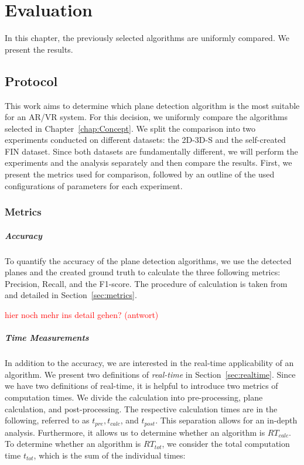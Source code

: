 \documentclass[main.tex]{subfiles}
\begin{document}
\chapter{Evaluation}
In this chapter, the previously selected algorithms are uniformly compared. We present the results.
\section{Protocol}

This work aims to determine which plane detection algorithm is the most suitable for an AR/VR system. For this decision, we uniformly compare the algorithms selected in
Chapter~\ref{chap:Concept}. We split the comparison into two experiments conducted on different datasets: the 2D-3D-S and the
self-created FIN dataset. Since both datasets are fundamentally different, we will perform the experiments and the analysis separately and then compare the results.
First, we present the metrics used for comparison, followed by an outline of the used configurations of parameters for each experiment.

\subsection{Metrics}
\label{subsec:metrics}
\paragraph{Accuracy}
To quantify the accuracy of the plane detection algorithms, we use the detected planes and the created ground truth to calculate the three following
metrics: Precision, Recall, and the F1-score. The procedure of calculation is taken from~\cite[Section~4]{Araújo_Oliveira_2020} and detailed
in Section~\ref{sec:metrics}.


\textcolor{red}{hier noch mehr ins detail gehen? (antwort) \underline{\hspace{2cm}}}

\paragraph{Time Measurements}
\label{par:time}
In addition to the accuracy, we are interested in the real-time applicability of an algorithm. We present two definitions
of \textit{real-time} in Section~\ref{sec:realtime}.
Since we have two definitions of real-time, it is helpful to introduce two metrics of computation times.
We divide the calculation into pre-processing, plane calculation, and post-processing.
The respective calculation times are in the following, referred to as $t_{pre}, t_{calc}$, and $t_{post}$.
This separation allows for an in-depth analysis. Furthermore, it allows us to determine
whether an algorithm is $RT_{calc}$. To determine whether an algorithm is $RT_{tot}$, we consider the
total computation time $t_{tot}$, which is the sum of the individual times:
\end{document}
